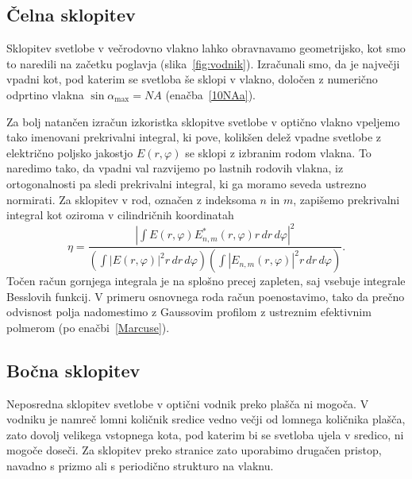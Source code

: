 \subsection*{Čelna sklopitev}
Sklopitev svetlobe v večrodovno vlakno lahko obravnavamo geometrijsko, kot smo to naredili
na začetku poglavja (slika~\ref{fig:vodnik}). Izračunali smo, da je največji 
vpadni kot, pod katerim se svetloba še sklopi v vlakno, določen z numerično odprtino 
vlakna $\sin \alpha_{\mathrm{max}}= NA$  (enačba~\ref{10NAa}).

Za bolj natančen izračun izkoristka sklopitve svetlobe v optično vlakno vpeljemo 
tako imenovani prekrivalni integral, ki pove, kolikšen delež vpadne svetlobe 
z električno poljsko jakostjo $E(r, \varphi)$ se sklopi z izbranim rodom 
vlakna.
To naredimo tako, da vpadni val razvijemo po lastnih rodovih vlakna, iz ortogonalnosti
pa sledi prekrivalni integral, ki ga moramo seveda ustrezno normirati. Za sklopitev v rod, 
označen z indeksoma $n$ in $m$, zapišemo prekrivalni integral kot
oziroma v cilindričnih koordinatah
\begin{equation}
\eta = \frac{|\int E(r, \varphi) E^*_{n,m}(r, \varphi) r\, dr\, d\varphi|^2}
{\left(\int |E(r, \varphi)|^2 r\, dr\, d\varphi \right) \left(\int |E_{n,m}(r, \varphi)|^2 
r\, dr\, d\varphi \right)}.
\label{10:prekint}
\end{equation}
Točen račun gornjega integrala je na splošno precej zapleten, saj vsebuje integrale
Besslovih funkcij. V primeru osnovnega roda račun poenostavimo, tako da 
prečno odvisnost polja nadomestimo z Gaussovim profilom z ustreznim 
efektivnim polmerom (po enačbi~\ref{Marcuse}). 

\subsection*{Bočna sklopitev}
Neposredna sklopitev svetlobe v optični vodnik preko plašča ni mogoča. V vodniku je namreč
lomni količnik sredice vedno večji od lomnega količnika plašča, zato dovolj velikega vstopnega 
kota, pod katerim bi se svetloba ujela v sredico, ni mogoče doseči. Za sklopitev preko stranice 
zato uporabimo drugačen pristop, navadno s prizmo ali s periodično strukturo na vlaknu. 

